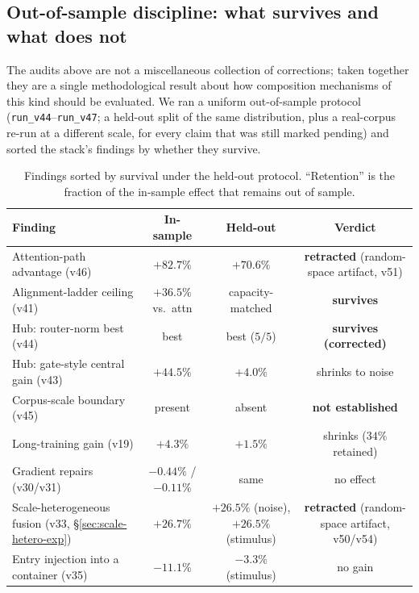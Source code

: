 \documentclass[10pt]{article}
\theoremstyle{definition}
\theoremstyle{plain}
\theoremstyle{remark}
\begin{document}
\subsection{Out-of-sample discipline: what survives and what does not}
\label{sec:oos}

The audits above are not a miscellaneous collection of corrections; taken together they are a single methodological result about how composition mechanisms of this kind should be evaluated. We ran a uniform out-of-sample protocol (\texttt{run\_v44}--\texttt{run\_v47}; a held-out split of the same distribution, plus a real-corpus re-run at a different scale, for every claim that was still marked pending) and sorted the stack's findings by whether they survive.

\begin{table}[htbp]
\centering
\caption{Findings sorted by survival under the held-out protocol. ``Retention'' is the fraction of the in-sample effect that remains out of sample.}
\label{tab:oos}
\small
\setlength{\tabcolsep}{4.5pt}
\begin{tabular}{p{}ccc}
\toprule
\textbf{Finding} & \textbf{In-sample} & \textbf{Held-out} & \textbf{Verdict} \\
\midrule
Attention-path advantage (v46) & $+82.7\%$ & $+70.6\%$ & \textbf{retracted} (random-space artifact, v51) \\
Alignment-ladder ceiling (v41) & $+36.5\%$ vs.\ attn & capacity-matched & \textbf{survives} \\
Hub: router-norm best (v44) & best & best ($5/5$) & \textbf{survives (corrected)} \\
Hub: gate-style central gain (v43) & $+44.5\%$ & $+4.0\%$ & shrinks to noise \\
Corpus-scale boundary (v45) & present & absent & \textbf{not established} \\
Long-training gain (v19) & $+4.3\%$ & $+1.5\%$ & shrinks ($34\%$ retained) \\
Gradient repairs (v30/v31) & $-0.44\%$ / $-0.11\%$ & same & no effect \\
Scale-heterogeneous fusion (v33, \S\ref{sec:scale-hetero-exp}) & $+26.7\%$ & $+26.5\%$ (noise), $+26.5\%$ (stimulus) & \textbf{retracted} (random-space artifact, v50/v54) \\
Entry injection into a container (v35) & $-11.1\%$ & $-3.3\%$ (stimulus) & no gain \\
\bottomrule
\end{tabular}
\end{table}
\end{document}
